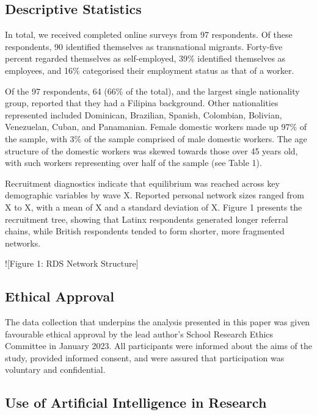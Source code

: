 \documentclass[
  12pt,
  letterpaper,
  DIV=11,
  numbers=noendperiod]{scrartcl}
\theoremstyle{plain}
\theoremstyle{definition}
\begin{document}
\subsection{Descriptive Statistics}\label{descriptive-statistics}

In total, we received completed online surveys from 97 respondents. Of
these respondents, 90 identified themselves as transnational migrants.
Forty-five percent regarded themselves as self-employed, 39\% identified
themselves as employees, and 16\% categorised their employment status as
that of a worker.

Of the 97 respondents, 64 (66\% of the total), and the largest single
nationality group, reported that they had a Filipina background. Other
nationalities represented included Dominican, Brazilian, Spanish,
Colombian, Bolivian, Venezuelan, Cuban, and Panamanian. Female domestic
workers made up 97\% of the sample, with 3\% of the sample comprised of
male domestic workers. The age structure of the domestic workers was
skewed towards those over 45 years old, with such workers representing
over half of the sample (see Table 1).

Recruitment diagnostics indicate that equilibrium was reached across key
demographic variables by wave X. Reported personal network sizes ranged
from X to X, with a mean of X and a standard deviation of X. Figure 1
presents the recruitment tree, showing that Latinx respondents generated
longer referral chains, while British respondents tended to form
shorter, more fragmented networks.

!{[}Figure 1: RDS Network Structure{]}

\subsection{Ethical Approval}\label{ethical-approval}

The data collection that underpins the analysis presented in this paper
was given favourable ethical approval by the lead author's School
Research Ethics Committee in January 2023. All participants were
informed about the aims of the study, provided informed consent, and
were assured that participation was voluntary and confidential.

\subsection{Use of Artificial Intelligence in
Research}\label{use-of-artificial-intelligence-in-research}
\end{document}
